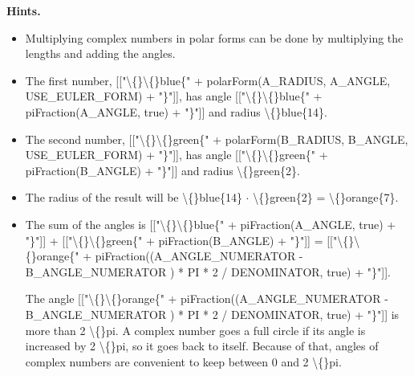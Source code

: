 \documentclass{article}
\begin{document}
\textbf{Hints.}
\begin{itemize}
  \item Multiplying complex numbers in polar forms can be done by multiplying the lengths
                    and adding the angles.
  \item The first number, [["\textbackslash\{\}\textbackslash\{\}blue\{" + polarForm(A\_RADIUS, A\_ANGLE, USE\_EULER\_FORM) + "\}"]],
                    has angle [["\textbackslash\{\}\textbackslash\{\}blue\{" + piFraction(A\_ANGLE, true) + "\}"]]
                    and radius \textbackslash\{\}blue\{14\}.
  \item The second number, [["\textbackslash\{\}\textbackslash\{\}green\{" + polarForm(B\_RADIUS, B\_ANGLE, USE\_EULER\_FORM) + "\}"]],
                    has angle [["\textbackslash\{\}\textbackslash\{\}green\{" + piFraction(B\_ANGLE) + "\}"]]
                    and radius \textbackslash\{\}green\{2\}.
  \item The radius of the result will be
                    \textbackslash\{\}blue\{14\} $\cdot$ \textbackslash\{\}green\{2\} = \textbackslash\{\}orange\{7\}.
  \item The sum of the angles is [["\textbackslash\{\}\textbackslash\{\}blue\{" + piFraction(A\_ANGLE, true) + "\}"]] + [["\textbackslash\{\}\textbackslash\{\}green\{" + piFraction(B\_ANGLE) + "\}"]] = [["\textbackslash\{\}\textbackslash\{\}orange\{" + piFraction((A\_ANGLE\_NUMERATOR - B\_ANGLE\_NUMERATOR ) * PI * 2 / DENOMINATOR, true) + "\}"]].
                    
                    
                        The angle [["\textbackslash\{\}\textbackslash\{\}orange\{" + piFraction((A\_ANGLE\_NUMERATOR - B\_ANGLE\_NUMERATOR ) * PI * 2 / DENOMINATOR, true) + "\}"]] is more than 2 \textbackslash\{\}pi.
                        A complex number goes a full circle if its angle is increased by 2 \textbackslash\{\}pi, so it goes back to itself.
                        Because of that, angles of complex numbers are convenient to keep between 0 and 2 \textbackslash\{\}pi.
                    

\end{itemize}
\end{document}
